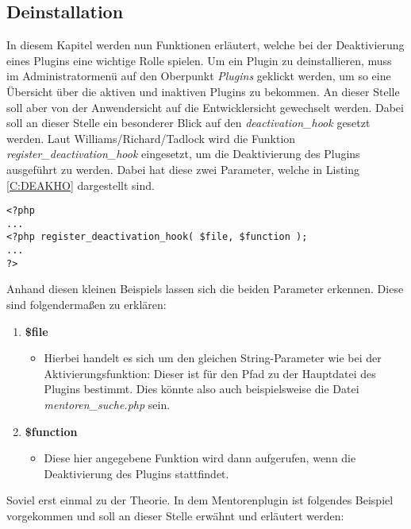 \subsection{Deinstallation}\label{Deaktivieren}
In diesem Kapitel werden nun Funktionen erläutert, welche bei der Deaktivierung eines Plugins eine wichtige Rolle spielen.\newline
Um ein Plugin zu deinstallieren, muss im Administratormenü auf den Oberpunkt \emph{Plugins} geklickt werden, um so eine Übersicht über die aktiven und inaktiven Plugins zu bekommen.\newline
An dieser Stelle soll aber von der Anwendersicht auf die Entwicklersicht gewechselt werden. \newline
Dabei soll an dieser Stelle ein besonderer Blick auf den \emph{deactivation\_hook} gesetzt werden.\newline
Laut Williams/Richard/Tadlock wird die Funktion \emph{register\_deactivation\_hook} eingesetzt, um die Deaktivierung des Plugins ausgeführt zu werden. Dabei hat diese zwei Parameter, welche in Listing \ref{C:DEAKHO} dargestellt sind.
\begin{lstlisting}
<?php
...
<?php register_deactivation_hook( $file, $function ); 
...
?>
\end{lstlisting}
Anhand diesen kleinen Beispiels lassen sich die beiden Parameter erkennen. Diese sind folgendermaßen zu erklären:
\begin{enumerate}
	\item \textbf{\$file}
	\begin{itemize}
		\item Hierbei handelt es sich um den gleichen String-Parameter wie bei der Aktivierungsfunktion: Dieser ist für den Pfad zu der Hauptdatei des Plugins bestimmt. Dies könnte also auch beispielsweise die Datei \emph{mentoren\_suche.php} sein.
	\end{itemize}
	\item \textbf{\$function}
	\begin{itemize}
		\item Diese hier angegebene Funktion wird dann aufgerufen, wenn die Deaktivierung des Plugins stattfindet.
	\end{itemize}
\end{enumerate}
Soviel erst einmal  zu der Theorie. In dem Mentorenplugin ist folgendes Beispiel vorgekommen und soll an dieser Stelle erwähnt und erläutert werden:
